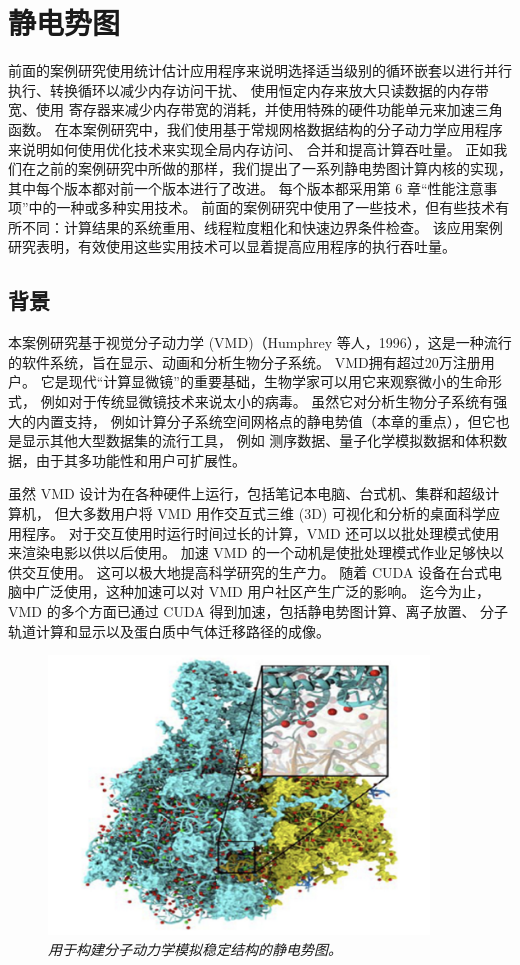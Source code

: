 \section{静电势图}
前面的案例研究使用统计估计应用程序来说明选择适当级别的循环嵌套以进行并行执行、转换循环以减少内存访问干扰、
使用恒定内存来放大只读数据的内存带宽、使用 寄存器来减少内存带宽的消耗，并使用特殊的硬件功能单元来加速三角函数。 
在本案例研究中，我们使用基于常规网格数据结构的分子动力学应用程序来说明如何使用优化技术来实现全局内存访问、
合并和提高计算吞吐量。 正如我们在之前的案例研究中所做的那样，我们提出了一系列静电势图计算内核的实现，
其中每个版本都对前一个版本进行了改进。 每个版本都采用第 6 章“性能注意事项”中的一种或多种实用技术。 
前面的案例研究中使用了一些技术，但有些技术有所不同：计算结果的系统重用、线程粒度粗化和快速边界条件检查。 
该应用案例研究表明，有效使用这些实用技术可以显着提高应用程序的执行吞吐量。

\subsection{背景}
本案例研究基于视觉分子动力学 (VMD)（Humphrey 等人，1996），这是一种流行的软件系统，旨在显示、动画和分析生物分子系统。 
VMD拥有超过20万注册用户。 它是现代“计算显微镜”的重要基础，生物学家可以用它来观察微小的生命形式，
例如对于传统显微镜技术来说太小的病毒。 虽然它对分析生物分子系统有强大的内置支持，
例如计算分子系统空间网格点的静电势值（本章的重点），但它也是显示其他大型数据集的流行工具，
例如 测序数据、量子化学模拟数据和体积数据，由于其多功能性和用户可扩展性。

虽然 VMD 设计为在各种硬件上运行，包括笔记本电脑、台式机、集群和超级计算机，
但大多数用户将 VMD 用作交互式三维 (3D) 可视化和分析的桌面科学应用程序。 
对于交互使用时运行时间过长的计算，VMD 还可以以批处理模式使用来渲染电影以供以后使用。 
加速 VMD 的一个动机是使批处理模式作业足够快以供交互使用。 这可以极大地提高科学研究的生产力。 
随着 CUDA 设备在台式电脑中广泛使用，这种加速可以对 VMD 用户社区产生广泛的影响。 
迄今为止，VMD 的多个方面已通过 CUDA 得到加速，包括静电势图计算、离子放置、
分子轨道计算和显示以及蛋白质中气体迁移路径的成像。

\begin{figure}[H]
	\centering
	\includegraphics[width=0.9\textwidth]{figs/F18.1.png}
	\caption{\textit{用于构建分子动力学模拟稳定结构的静电势图。}}
\end{figure}

